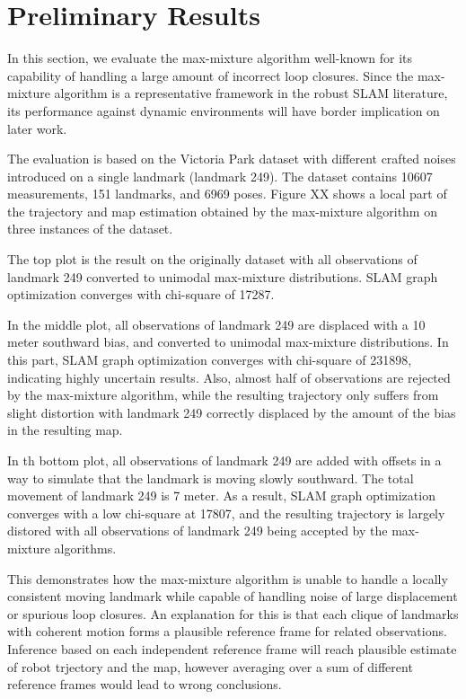 \section{Preliminary Results}

In this section, we evaluate the max-mixture algorithm well-known for its
capability of handling a large amount of incorrect loop closures. Since the
max-mixture algorithm is a representative framework in the robust SLAM
literature, its performance against dynamic environments will have border
implication on later work.

The evaluation is based on the Victoria Park dataset with different crafted
noises introduced on a single landmark (landmark 249). The dataset contains
10607 measurements, 151 landmarks, and 6969 poses. Figure XX shows a local
part of the trajectory and map estimation obtained by the max-mixture
algorithm on three instances of the dataset.

The top plot is the result on the originally dataset with all observations of
landmark 249 converted to unimodal max-mixture distributions. SLAM graph
optimization converges with chi-square of 17287.

In the middle plot, all observations of landmark 249 are displaced with a 10
meter southward bias, and converted to unimodal max-mixture distributions. In
this part, SLAM graph optimization converges with chi-square of 231898,
indicating highly uncertain results. Also, almost half of observations are
rejected by the max-mixture algorithm, while the resulting trajectory only
suffers from slight distortion with landmark 249 correctly displaced by the
amount of the bias in the resulting map.

In th bottom plot, all observations of landmark 249 are added with offsets in
a way to simulate that the landmark is moving slowly southward. The total
movement of landmark 249 is 7 meter. As a result, SLAM graph optimization
converges with a low chi-square at 17807, and the resulting trajectory is
largely distored with all observations of landmark 249 being accepted by the
max-mixture algorithms.

This demonstrates how the max-mixture algorithm is unable to handle a locally
consistent moving landmark while capable of handling noise of large
displacement or spurious loop closures. An explanation for this is that each
clique of landmarks with coherent motion forms a plausible reference frame for
related observations. Inference based on each independent reference frame will
reach plausible estimate of robot trjectory and the map, however averaging over
a sum of different reference frames would lead to wrong conclusions.

